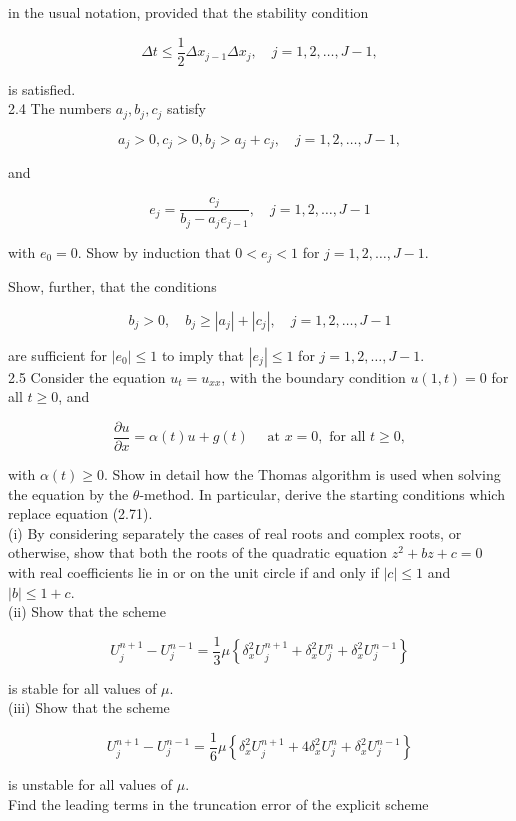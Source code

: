 \documentclass[10pt]{article}
\begin{document}
in the usual notation, provided that the stability condition

\[
\Delta t \leq \frac{1}{2} \Delta x_{j-1} \Delta x_{j}, \quad j=1,2, \ldots, J-1,
\]

is satisfied.\\
2.4 The numbers \(a_{j}, b_{j}, c_{j}\) satisfy

\[
a_{j}>0, c_{j}>0, b_{j}>a_{j}+c_{j}, \quad j=1,2, \ldots, J-1,
\]

and

\[
e_{j}=\frac{c_{j}}{b_{j}-a_{j} e_{j-1}}, \quad j=1,2, \ldots, J-1
\]

with \(e_{0}=0\). Show by induction that \(0<e_{j}<1\) for \(j= 1,2, \ldots, J-1\).

Show, further, that the conditions

\[
b_{j}>0, \quad b_{j} \geq\left|a_{j}\right|+\left|c_{j}\right|, \quad j=1,2, \ldots, J-1
\]

are sufficient for \(\left|e_{0}\right| \leq 1\) to imply that \(\left|e_{j}\right| \leq 1\) for \(j= 1,2, \ldots, J-1\).\\
2.5 Consider the equation \(u_{t}=u_{x x}\), with the boundary condition \(u(1, t)=0\) for all \(t \geq 0\), and

\[
\frac{\partial u}{\partial x}=\alpha(t) u+g(t) \quad \text { at } x=0, \text { for all } t \geq 0,
\]

with \(\alpha(t) \geq 0\). Show in detail how the Thomas algorithm is used when solving the equation by the \(\theta\)-method. In particular, derive the starting conditions which replace equation (2.71).\\
(i) By considering separately the cases of real roots and complex roots, or otherwise, show that both the roots of the quadratic equation \(z^{2}+b z+c=0\) with real coefficients lie in or on the unit circle if and only if \(|c| \leq 1\) and \(|b| \leq 1+c\).\\
(ii) Show that the scheme

\[
U_{j}^{n+1}-U_{j}^{n-1}=\frac{1}{3} \mu\left\{\delta_{x}^{2} U_{j}^{n+1}+\delta_{x}^{2} U_{j}^{n}+\delta_{x}^{2} U_{j}^{n-1}\right\}
\]

is stable for all values of \(\mu\).\\
(iii) Show that the scheme

\[
U_{j}^{n+1}-U_{j}^{n-1}=\frac{1}{6} \mu\left\{\delta_{x}^{2} U_{j}^{n+1}+4 \delta_{x}^{2} U_{j}^{n}+\delta_{x}^{2} U_{j}^{n-1}\right\}
\]

is unstable for all values of \(\mu\).\\
Find the leading terms in the truncation error of the explicit scheme
\end{document}
